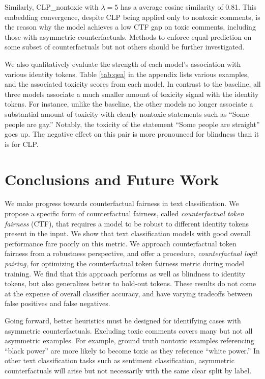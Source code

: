 \documentclass[letterpaper]{article} %
\theoremstyle{definition}
\begin{document}
Similarly, CLP\_nontoxic with $\lambda=5$ has a average cosine similarity of 0.81. This embedding convergence, despite CLP being applied only to nontoxic comments, is the reason why the model achieves a low CTF gap on toxic comments, including those with asymmetric counterfactuals. Methods to enforce equal prediction on some subset of counterfactuals but not others should be further investigated. 


We also qualitatively evaluate the strength of each model's association with various identity tokens. Table \ref{tab:qea} in the appendix lists various examples, and the associated toxicity scores from each model. In contrast to the baseline, all three models associate a much smaller amount of toxicity signal with the identity tokens. For instance, unlike the baseline, the other models no longer associate a substantial amount of toxicity with clearly nontoxic statements such as ``Some people are gay.'' Notably, the toxicity of the statement ``Some people are straight'' goes up. The negative effect on this pair is more pronounced for blindness than it is for CLP.


\section{Conclusions and Future Work} \label{disc}
We make progress towards counterfactual fairness in text classification. We propose a specific form of counterfactual fairness, called \emph{counterfactual token fairness} (CTF), that requires a model to be robust to different identity tokens present in the input. We show that text classification models with good overall performance fare poorly on this metric. 
We approach counterfactual token fairness from a robustness perspective, and offer a procedure, \emph{counterfactual logit pairing}, for optimizing the counterfactual token fairness metric during model training. 
We find that this approach performs as well as blindness to identity tokens, but also generalizes better to hold-out tokens. 
These results do not come at the expense of overall classifier accuracy, and have varying tradeoffs between false positives and false negatives.

Going forward, better heuristics must be designed for identifying cases with asymmetric counterfactuals. Excluding toxic comments covers many but not all asymmetric examples. For example, ground truth nontoxic examples referencing ``black power'' are more likely to become toxic as they reference ``white power.'' In other text classification tasks such as sentiment classification, asymmetric counterfactuals will arise but not necessarily with the same clear split by label. 
\end{document}
